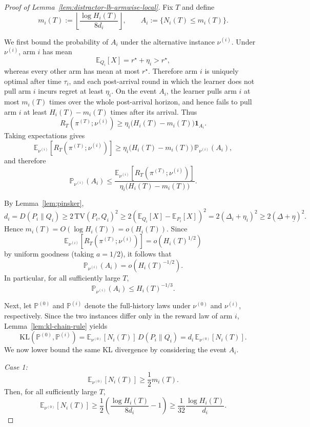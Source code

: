 \documentclass[
  12pt]{article}
\begin{document}
\begin{proof}[Proof of Lemma~\ref{lem:distractor-lb-armwise-local}]
Fix $T$ and define
\[
m_i(T):=\left\lfloor \frac{\log H_i(T)}{8d_i}\right\rfloor,
\qquad
A_i:=\{N_i(T)\le m_i(T)\}.
\]

We first bound the probability of $A_i$ under the alternative instance
$\nu^{(i)}$. Under $\nu^{(i)}$, arm $i$ has mean
\[
\mathbb E_{Q_i}[X]=r^\star+\eta_i>r^\star,
\]
whereas every other arm has mean at most $r^\star$. Therefore arm $i$ is
uniquely optimal after time $\tau_i$, and each post-arrival round in which the
learner does not pull arm $i$ incurs regret at least $\eta_i$. On the event
$A_i$, the learner pulls arm $i$ at most $m_i(T)$ times over the whole
post-arrival horizon, and hence fails to pull arm $i$ at least
$H_i(T)-m_i(T)$ times after its arrival. Thus
\[
R_T(\pi^{(T)};\nu^{(i)})
\ge
\eta_i\bigl(H_i(T)-m_i(T)\bigr)\mathbf 1_{A_i}.
\]
Taking expectations gives
\[
\mathbb E_{\nu^{(i)}}[R_T(\pi^{(T)};\nu^{(i)})]
\ge
\eta_i\bigl(H_i(T)-m_i(T)\bigr)\,\mathbb P_{\nu^{(i)}}(A_i),
\]
and therefore
\[
\mathbb P_{\nu^{(i)}}(A_i)
\le
\frac{\mathbb E_{\nu^{(i)}}[R_T(\pi^{(T)};\nu^{(i)})]}
{\eta_i\bigl(H_i(T)-m_i(T)\bigr)}.
\]

By Lemma~\ref{lem:pinsker},
\[
d_i
=
D(P_i\|Q_i)
\ge
2\,\mathrm{TV}(P_i,Q_i)^2
\ge
2\left(\mathbb E_{Q_i}[X]-\mathbb E_{P_i}[X]\right)^2
=
2(\Delta_i+\eta_i)^2
\ge
2(\underline\Delta+\underline\eta)^2.
\]
Hence $m_i(T)=O(\log H_i(T))=o(H_i(T))$. Since
\[
\mathbb E_{\nu^{(i)}}[R_T(\pi^{(T)};\nu^{(i)})]
=
o(H_i(T)^{1/2})
\]
by uniform goodness (taking $a=1/2$), it follows that
\[
\mathbb P_{\nu^{(i)}}(A_i)=o(H_i(T)^{-1/2}).
\]
In particular, for all sufficiently large $T$,
\begin{equation}
\mathbb P_{\nu^{(i)}}(A_i)\le H_i(T)^{-1/3}.
\label{eq:distractor-armwise-A1}
\end{equation}

Next, let $\mathbb P^{(0)}$ and $\mathbb P^{(i)}$ denote the full-history laws
under $\nu^{(0)}$ and $\nu^{(i)}$, respectively. Since the two instances differ
only in the reward law of arm $i$, Lemma~\ref{lem:kl-chain-rule} yields
\begin{equation}
\mathrm{KL}(\mathbb P^{(0)},\mathbb P^{(i)})
=
\mathbb E_{\nu^{(0)}}[N_i(T)]\,D(P_i\|Q_i)
=
d_i\,\mathbb E_{\nu^{(0)}}[N_i(T)].
\label{eq:distractor-armwise-A2}
\end{equation}
We now lower bound the same KL divergence by considering the event $A_i$.

\medskip
\noindent
\textit{Case 1:}
\[
\mathbb E_{\nu^{(0)}}[N_i(T)]\ge \frac12 m_i(T).
\]
Then, for all sufficiently large $T$,
\[
\mathbb E_{\nu^{(0)}}[N_i(T)]
\ge
\frac12\left(\frac{\log H_i(T)}{8d_i}-1\right)
\ge
\frac{1}{32}\frac{\log H_i(T)}{d_i}.
\]


\end{proof}
\end{document}
